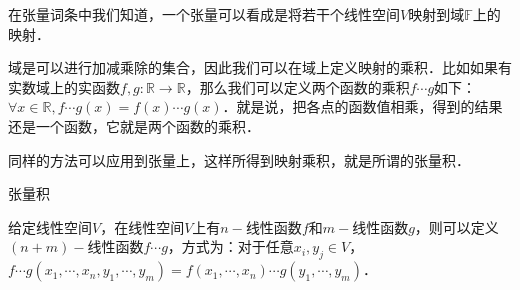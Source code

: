 
在张量词条中我们知道，一个张量可以看成是将若干个线性空间$V$映射到域$\mathbb{F}$上的映射．

域是可以进行加减乘除的集合，因此我们可以在域上定义映射的乘积．比如如果有实数域上的实函数$f, g:\mathbb{R}\rightarrow\mathbb{R}$，那么我们可以定义两个函数的乘积$f\cdots g$如下：$\forall x\in\mathbb{R}, f\cdots g(x)=f(x)\cdots g(x)$．就是说，把各点的函数值相乘，得到的结果还是一个函数，它就是两个函数的乘积．

同样的方法可以应用到张量上，这样所得到映射乘积，就是所谓的张量积．

\begin{definition}{张量积}

给定线性空间$V$，在线性空间$V$上有$n-$线性函数$f$和$m-$线性函数$g$，则可以定义$(n+m)-$线性函数$f\cdots g$，方式为：对于任意$x_i, y_j\in V$，$f\cdots g(x_1, \cdots, x_n, y_1, \cdots, y_m)=f(x_1, \cdots, x_n)\cdots g(y_1, \cdots, y_m)$．

\end{definition}

